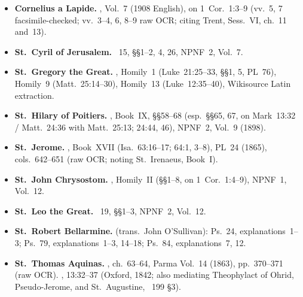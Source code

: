 \begin{itemize}[leftmargin=1.5em,itemsep=0.25em]
\item \textbf{Cornelius a Lapide.} , Vol.~7 (1908 English), on 1~Cor.~1:3--9 (vv.~5, 7 facsimile-checked; vv.~3--4, 6, 8--9 raw OCR; citing Trent, Sess.~VI, ch.~11 and~13).

\item \textbf{St.~Cyril of Jerusalem.} ~15, §§1--2, 4, 26, NPNF~2, Vol.~7.

\item \textbf{St.~Gregory the Great.} , Homily~1 (Luke~21:25--33, §§1, 5, PL~76), Homily~9 (Matt.~25:14--30), Homily~13 (Luke~12:35--40), Wikisource Latin extraction.

\item \textbf{St.~Hilary of Poitiers.} , Book~IX, §§58--68 (esp.\ §§65, 67, on Mark~13:32 / Matt.~24:36 with Matt.~25:13; 24:44, 46), NPNF~2, Vol.~9 (1898).

\item \textbf{St.~Jerome.} , Book~XVII (Isa.~63:16--17; 64:1, 3--8), PL~24 (1865), cols.~642--651 (raw OCR; noting St.~Irenaeus,  Book~I).

\item \textbf{St.~John Chrysostom.} , Homily~II (§§1--8, on 1~Cor.~1:4--9), NPNF~1, Vol.~12.

\item \textbf{St.~Leo the Great.} ~19, §§1--3, NPNF~2, Vol.~12.

\item \textbf{St.~Robert Bellarmine.}  (trans.\ John O'Sullivan): Ps.~24, explanations~1--3; Ps.~79, explanations~1--3, 14--18; Ps.~84, explanations~7, 12.

\item \textbf{St.~Thomas Aquinas.} , ch.~63--64, Parma Vol.~14 (1863), pp.~370--371 (raw OCR). , 13:32--37 (Oxford, 1842; also mediating Theophylact of Ohrid, Pseudo-Jerome, and St.~Augustine, ~199 §3).

\end{itemize}
